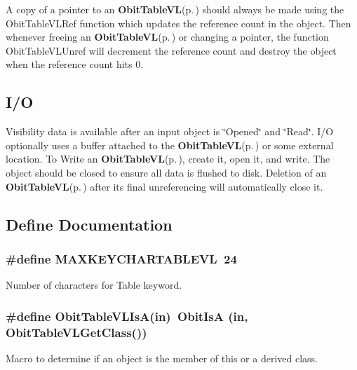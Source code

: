A copy of a pointer to an {\bf Obit\-Table\-VL}{\rm (p.\,\pageref{structObitTableVL})} should always be made using the Obit\-Table\-VLRef function which updates the reference count in the object. Then whenever freeing an {\bf Obit\-Table\-VL}{\rm (p.\,\pageref{structObitTableVL})} or changing a pointer, the function Obit\-Table\-VLUnref will decrement the reference count and destroy the object when the reference count hits 0.\subsection{I/O}\label{ObitTableVL_8h_ObitTableVLUsage}
Visibility data is available after an input object is \char`\"{}Opened\char`\"{} and \char`\"{}Read\char`\"{}. I/O optionally uses a buffer attached to the {\bf Obit\-Table\-VL}{\rm (p.\,\pageref{structObitTableVL})} or some external location. To Write an {\bf Obit\-Table\-VL}{\rm (p.\,\pageref{structObitTableVL})}, create it, open it, and write. The object should be closed to ensure all data is flushed to disk. Deletion of an {\bf Obit\-Table\-VL}{\rm (p.\,\pageref{structObitTableVL})} after its final unreferencing will automatically close it.

\subsection{Define Documentation}
\subsubsection{\setlength{\rightskip}{0pt plus 5cm}\#define MAXKEYCHARTABLEVL\ 24}\label{ObitTableVL_8h_a0}


Number of characters for Table keyword. 

\subsubsection{\setlength{\rightskip}{0pt plus 5cm}\#define Obit\-Table\-VLIs\-A(in)\ Obit\-Is\-A (in, Obit\-Table\-VLGet\-Class())}\label{ObitTableVL_8h_a3}


Macro to determine if an object is the member of this or a derived class. 

